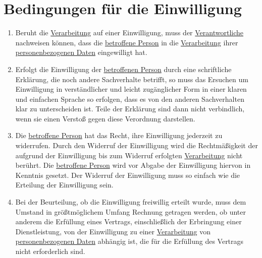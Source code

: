 \chapter{Bedingungen für die Einwilligung}
\label{ch:7}


\begin{enumerate}

  \item Beruht die \hyperref[itm:04-2]{Verarbeitung} auf einer Einwilligung, muss der \hyperref[itm:04-7]{Verantwortliche} nachweisen können, dass die \hyperref[itm:04-1]{betroffene
   Person} in die \hyperref[itm:04-2]{Verarbeitung} ihrer \hyperref[itm:04-1]{personenbezogenen Daten} eingewilligt hat.
  \label{itm:07-1}

  \item Erfolgt die Einwilligung der \hyperref[itm:04-1]{betroffenen Person} durch eine schriftliche Erklärung, die noch andere Sachverhalte
   betrifft, so muss das Ersuchen um Einwilligung in verständlicher und leicht zugänglicher Form in einer klaren und
   einfachen Sprache so erfolgen, dass es von den anderen Sachverhalten klar zu unterscheiden ist. Teile der Erklärung
   sind dann nicht verbindlich, wenn sie einen Verstoß gegen diese Verordnung darstellen.
  \label{itm:07-2}

  \item Die \hyperref[itm:04-1]{betroffene Person} hat das Recht, ihre Einwilligung jederzeit zu widerrufen. Durch den Widerruf der
   Einwilligung wird die Rechtmäßigkeit der aufgrund der Einwilligung bis zum Widerruf erfolgten \hyperref[itm:04-2]{Verarbeitung} nicht
   berührt. Die \hyperref[itm:04-1]{betroffene Person} wird vor Abgabe der Einwilligung hiervon in Kenntnis gesetzt. Der Widerruf der
   Einwilligung muss so einfach wie die Erteilung der Einwilligung sein.
  \label{itm:07-3}

  \item Bei der Beurteilung, ob die Einwilligung freiwillig erteilt wurde, muss dem Umstand in größtmöglichem Umfang
   Rechnung getragen werden, ob unter anderem die Erfüllung eines Vertrags, einschließlich der Erbringung einer
   Dienstleistung, von der Einwilligung zu einer \hyperref[itm:04-2]{Verarbeitung} von \hyperref[itm:04-1]{personenbezogenen Daten} abhängig ist, die für die
   Erfüllung des Vertrags nicht erforderlich sind.
  \label{itm:07-4}

\end{enumerate}


